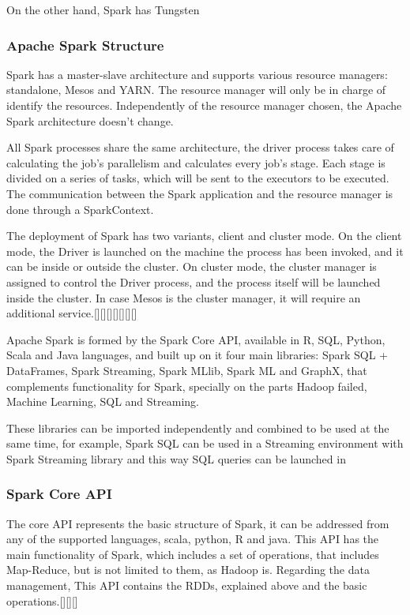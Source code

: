 \documentclass[11pt]{article} %
\begin{document}
        On the other hand, Spark has Tungsten



    \subsubsection{Apache Spark Structure}

      Spark has a master-slave architecture and supports various resource managers: standalone, Mesos and YARN. The resource manager will only be in charge of identify the resources. Independently of the resource manager chosen, the Apache Spark architecture doesn't change.

      All Spark processes share the same architecture, the driver process takes care of calculating the job's parallelism and calculates every job's stage. Each stage is divided on a series of tasks, which will be sent to the executors to be executed. The communication between the Spark application and the resource manager is done through a SparkContext.

      The deployment of Spark has two variants, client and cluster mode. On the client mode, the Driver is launched on the machine the process has been invoked, and it can be inside or outside the cluster. On cluster mode, the cluster manager is assigned to control the Driver process, and the process itself will be launched inside the cluster. In case Mesos is the cluster manager, it will require an additional service.[][][][][][][]

      Apache Spark is formed by the Spark Core API, available in R, SQL, Python, Scala and Java languages, and built up on it four main libraries: Spark SQL + DataFrames, Spark Streaming, Spark MLlib, Spark ML and GraphX, that complements functionality for Spark, specially on the parts Hadoop failed, Machine Learning, SQL and Streaming.

      These libraries can be imported independently and combined to be used at the same time, for example, Spark SQL can be used in a Streaming environment with Spark Streaming library and this way SQL queries can be launched in

      \subsubsection*{Spark Core API}

        The core API represents the basic structure of Spark, it can be addressed from any of the supported languages, scala, python, R and java. This API has the main functionality of Spark, which includes a set of operations, that includes Map-Reduce, but is not limited to them, as Hadoop is.
        Regarding the data management, This API contains the RDDs, explained above and the basic operations.[][][]
\end{document}
